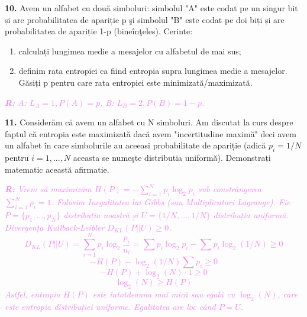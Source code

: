 \documentclass[a4paper]{article}
\newcommand{\hl}[1]{\textcolor{violet}{\textit{#1}}}
\newenvironment{definition}[1]
    {\begin{definitionbox}[frametitle={#1}]}
    {\end{definitionbox}}
\begin{document}
\textbf{10.} Avem un alfabet cu două simboluri: simbolul "A" este codat pe un singur bit și are probabilitatea
de apariție p şi simbolul "B" este codat pe doi biți și are probabilitatea de apariție 1-p (bineînţeles).
Cerinte:
\begin{enumerate}[label=(\alph*)]
    \item calculați lungimea medie a mesajelor cu alfabetul de mai sus;
    \item definim rata entropiei ca fiind entropia supra lungimea medie a mesajelor. Găsiți p pentru
care rata entropiei este minimizată/maximizată.
\end{enumerate}
\begin{definition}{}
\hl{\textbf{R:} A: $L_A=1, P(A)=p$. B: $L_B=2, P(B)=1-p$.}
\end{definition}

\textbf{11.} Considerăm că avem un alfabet cu N simboluri. Am discutat la curs despre faptul că entropia este
maximizată dacă avem "incertitudine maximă" deci avem un alfabet în care simbolurile au aceeasi
probabilitate de apariție (adică $p_{i}=1/N$ pentru $i=1,...,N$ aceasta se numeşte distributia
uniformă).
Demonstrați matematic această afirmatie.
\begin{definition}{}
\hl{\textbf{R:} Vrem să maximizăm $H(P) = -\sum_{i=1}^N p_i \log_2 p_i$ sub constrângerea $\sum_{i=1}^N p_i = 1$.
Folosim Inegalitatea lui Gibbs (sau Multiplicatori Lagrange).
Fie $P = \{p_1, ..., p_N\}$ distribuția noastră și $U = \{1/N, ..., 1/N\}$ distribuția uniformă.
Divergența Kullback-Leibler $D_{KL}(P || U) \ge 0$.
\[ D_{KL}(P || U) = \sum_{i=1}^N p_i \log_2 \frac{p_i}{u_i} = \sum p_i \log_2 p_i - \sum p_i \log_2(1/N) \ge 0 \]
\[ -H(P) - \log_2(1/N) \sum p_i \ge 0 \]
\[ -H(P) + \log_2(N) \cdot 1 \ge 0 \]
\[ \log_2(N) \ge H(P) \]
Astfel, entropia $H(P)$ este întotdeauna mai mică sau egală cu $\log_2(N)$, care este entropia distribuției uniforme. Egalitatea are loc când $P=U$.}
\end{definition}
\end{document}

